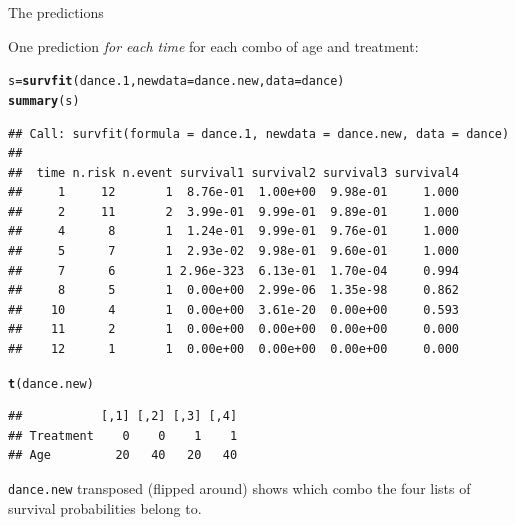 \documentclass[unknownkeysallowed]{beamer}\usepackage[]{graphicx}\usepackage[]{color}
\makeatletter
\newcommand{\hlstd}[1]{\textcolor[rgb]{0.345,0.345,0.345}{#1}}%
\newcommand{\hlkwb}[1]{\textcolor[rgb]{0.69,0.353,0.396}{#1}}%
\newcommand{\hlkwc}[1]{\textcolor[rgb]{0.333,0.667,0.333}{#1}}%
\newcommand{\hlkwd}[1]{\textcolor[rgb]{0.737,0.353,0.396}{\textbf{#1}}}%
\newenvironment{kframe}{%
 \def\at@end@of@kframe{}%
 \ifinner\ifhmode%
  \def\at@end@of@kframe{\end{minipage}}%
  \begin{minipage}{\columnwidth}%
 \fi\fi%
 \def\FrameCommand##1{\hskip\@totalleftmargin \hskip-\fboxsep
 \colorbox{shadecolor}{##1}\hskip-\fboxsep
     \hskip-\linewidth \hskip-\@totalleftmargin \hskip\columnwidth}%
 \MakeFramed {\advance\hsize-\width
   \@totalleftmargin\z@ \linewidth\hsize
   \@setminipage}}%
 {\par\unskip\endMakeFramed%
 \at@end@of@kframe}
\newenvironment{knitrout}{}{} %
\makeatother
\begin{document}
\begin{frame}[fragile]{The predictions}

One prediction \emph{for each time} for each combo of age and treatment:


 
\begin{knitrout}\footnotesize
{}\color{fgcolor}\begin{kframe}
\begin{alltt}
\hlstd{s}\hlkwb{=}\hlkwd{survfit}\hlstd{(dance.1,}\hlkwc{newdata}\hlstd{=dance.new,}\hlkwc{data}\hlstd{=dance)}
\hlkwd{summary}\hlstd{(s)}
\end{alltt}
\begin{verbatim}
## Call: survfit(formula = dance.1, newdata = dance.new, data = dance)
## 
##  time n.risk n.event survival1 survival2 survival3 survival4
##     1     12       1  8.76e-01  1.00e+00  9.98e-01     1.000
##     2     11       2  3.99e-01  9.99e-01  9.89e-01     1.000
##     4      8       1  1.24e-01  9.99e-01  9.76e-01     1.000
##     5      7       1  2.93e-02  9.98e-01  9.60e-01     1.000
##     7      6       1 2.96e-323  6.13e-01  1.70e-04     0.994
##     8      5       1  0.00e+00  2.99e-06  1.35e-98     0.862
##    10      4       1  0.00e+00  3.61e-20  0.00e+00     0.593
##    11      2       1  0.00e+00  0.00e+00  0.00e+00     0.000
##    12      1       1  0.00e+00  0.00e+00  0.00e+00     0.000
\end{verbatim}
\end{kframe}
\end{knitrout}

\begin{multicols}{2}
\begin{knitrout}\scriptsize
{}\color{fgcolor}\begin{kframe}
\begin{alltt}
\hlkwd{t}\hlstd{(dance.new)}
\end{alltt}
\begin{verbatim}
##           [,1] [,2] [,3] [,4]
## Treatment    0    0    1    1
## Age         20   40   20   40
\end{verbatim}
\end{kframe}
\end{knitrout}

\texttt{dance.new} transposed (flipped around) shows which combo the
four lists of survival probabilities belong to.
  
\end{multicols}
  
\end{frame}
\end{document}
